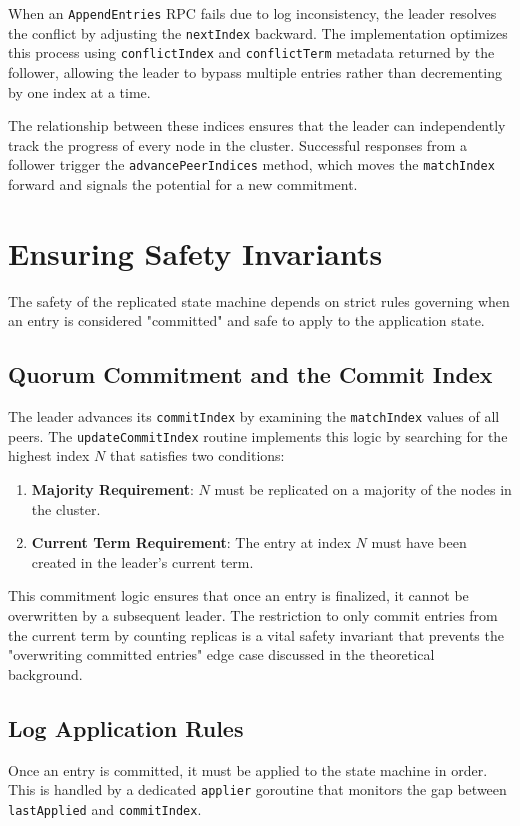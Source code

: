 When an \texttt{AppendEntries} RPC fails due to log inconsistency, the leader resolves the conflict by adjusting the \texttt{nextIndex} backward.
The implementation optimizes this process using \texttt{conflictIndex} and \texttt{conflictTerm} metadata returned by the follower, allowing the leader to bypass multiple entries rather than decrementing by one index at a time.

The relationship between these indices ensures that the leader can independently track the progress of every node in the cluster. Successful responses from a follower trigger the \texttt{advancePeerIndices} method, which moves the \texttt{matchIndex} forward and signals the potential for a new commitment.

\section{Ensuring Safety Invariants}
The safety of the replicated state machine depends on strict rules governing when an entry is considered "committed" and safe to apply to the application state.

\subsection{Quorum Commitment and the Commit Index}
The leader advances its \texttt{commitIndex} by examining the \texttt{matchIndex} values of all peers.
The \texttt{updateCommitIndex} routine implements this logic by searching for the highest index $N$ that satisfies two conditions:
\begin{enumerate}
    \item \textbf{Majority Requirement}: $N$ must be replicated on a majority of the nodes in the cluster.
    \item \textbf{Current Term Requirement}: The entry at index $N$ must have been created in the leader's current term.
\end{enumerate}

This commitment logic ensures that once an entry is finalized, it cannot be overwritten by a subsequent leader. The restriction to only commit entries from the current term by counting replicas is a vital safety invariant that prevents the "overwriting committed entries" edge case discussed in the theoretical background.

\subsection{Log Application Rules}
Once an entry is committed, it must be applied to the state machine in order. This is handled by a dedicated \texttt{applier} goroutine that monitors the gap between \texttt{lastApplied} and \texttt{commitIndex}.

